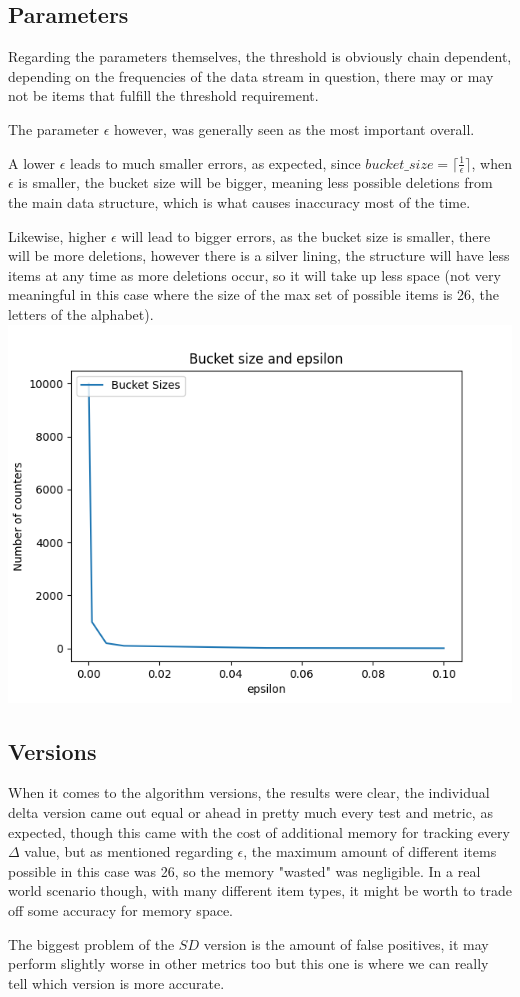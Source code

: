 \documentclass[...]{revdetua}
\begin{document}
\subsection{Parameters}
Regarding the parameters themselves, the threshold is obviously chain dependent, depending on the frequencies of the data stream in question, there may or may not be items that fulfill the threshold requirement.\par
The parameter $\epsilon$ however, was generally seen as the most important overall.\par
A lower $\epsilon$ leads to much smaller errors, as expected, since $bucket\_size=\lceil \frac{1}{\epsilon} \rceil$, when $\epsilon$ is smaller, the bucket size will be bigger, meaning less possible deletions from the main data structure, which is what causes inaccuracy most of the time.\par
Likewise, higher $\epsilon$ will lead to bigger errors, as the bucket size is smaller, there will be more deletions, however there is a silver lining, the structure will have less items at any time as more deletions occur, so it will take up less space (not very meaningful in this case where the size of the max set of possible items is 26, the letters of the alphabet).
\includegraphics[scale=0.5]{bucket size.png}



\subsection{Versions}
When it comes to the algorithm versions, the results were clear, the individual delta version came out equal or ahead in pretty much every test and metric, as expected, though this came with the cost of additional memory for tracking every $\Delta$ value, but as mentioned regarding $\epsilon$, the maximum amount of different items possible in this case was 26, so the memory "wasted" was negligible. In a real world scenario though, with many different item types, it might be worth to trade off some accuracy for memory space.\par
The biggest problem of the $SD$ version is the amount of false positives, it may perform slightly worse in other metrics too but this one is where we can really tell which version is more accurate.
\end{document}
